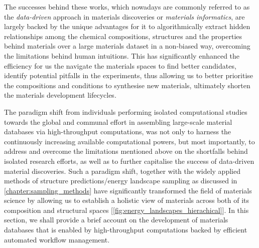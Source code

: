 The successes behind these works, which nowadays are commonly referred to as the \emph{data-driven} approach in materials discoveries or \emph{materials informatics}, are largely backed by the unique advantages for it to algorithmically extract hidden relationships among the chemical compositions, structures and the properties behind materials over a large materials dataset in a non-biased way, overcoming the limitations behind human intuitions. This has significantly enhanced the efficiency for us the navigate the materials spaces to find better candidates, identify potential pitfalls in the experiments, thus allowing us to better prioritise the compositions and conditions to synthesise new materials, ultimately shorten the materials development lifecycles. 

The paradigm shift from individuals performing isolated computational studies towards the global and communal effort in assembling large-scale material databases via high-throughput computations,\cite{jain2013commentary,saal2013materials,choudhary2020high,draxl2019nomad,haas2009calculation,gjerding2021recent,chanussot2021open,tran2023open} was not only to harness the continuously increasing available computational powers, but most importantly, to address and overcome the limitations mentioned above on the shortfalls behind isolated research efforts, as well as to further capitalise the success of data-driven material discoveries. Such a paradigm shift, together with the widely applied methods of structure predictions/energy landscape sampling as discussed in \cref{chapter:sampling_methods} have significantly transformed the field of materials science by allowing us to establish a holistic view of materials across both of its composition and structural spaces [\cref{fig:energy_landscapes_hierachical}].  In this section, we shall provide a brief account on  the development of materials databases that is enabled by high-throughput computations backed by efficient automated workflow management.

